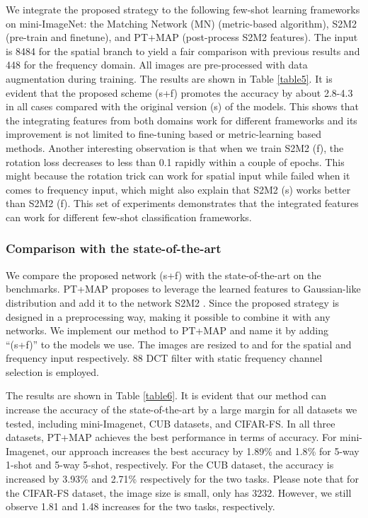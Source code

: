 \documentclass[10pt, conference, compsocconf]{IEEEtran}
\begin{document}
We integrate the proposed strategy to the following few-shot learning frameworks on mini-ImageNet: the Matching Network (MN) \cite{vinyals2016matching} (metric-based algorithm), S2M2 \cite{mangla2020charting} (pre-train and finetune), and PT+MAP \cite{hu2020leveraging} (post-process S2M2 features). The input is 8484 for the spatial branch to yield a fair comparison with previous results and 448 for the frequency domain. All images are pre-processed with data augmentation during training. The results are shown in Table \ref{table5}. It is evident that the proposed scheme (s+f) promotes the accuracy by about 2.8-4.3 in all cases compared with the original version (s) of the models. This shows that the integrating features from both domains work for different frameworks and its improvement is not limited to fine-tuning based or metric-learning based methods. Another interesting observation is that when we train S2M2 (f), the rotation loss decreases to less than 0.1 rapidly within a couple of epochs. This might because the rotation trick can work for spatial input while failed when it comes to frequency input, which might also explain that S2M2 (s) works better than S2M2 (f). This set of experiments demonstrates that the integrated features can work for different few-shot classification frameworks.

\subsubsection{Comparison with the state-of-the-art}

We compare the proposed network (s+f) with the state-of-the-art on the benchmarks. PT+MAP \cite{hu2020leveraging} proposes to leverage the learned features to Gaussian-like distribution and add it to the network S2M2 \cite{mangla2020charting}. Since the proposed strategy is designed in a preprocessing way, making it possible to combine it with any networks. We implement our method to PT+MAP and name it by adding \enquote{(s+f)} to the models we use. The images are resized to  and  for the spatial and frequency input respectively. 88 DCT filter with static frequency channel selection is employed. 

The results are shown in Table \ref{table6}. It is evident that our method can increase the accuracy of the state-of-the-art by a large margin for all datasets we tested, including mini-Imagenet, CUB datasets, and CIFAR-FS. In all three datasets, PT+MAP achieves the best performance in terms of accuracy. For mini-Imagenet, our approach increases the best accuracy by {}{1.89}\% and {}{1.8}\% for 5-way 1-shot and 5-way 5-shot, respectively. For the CUB dataset, the accuracy is increased by {}{3.93}\% and 2.71\% respectively for the two tasks. Please note that for the CIFAR-FS dataset, the image size is small, only has 3232. However, we still observe {}{1.81} and {}{1.48} increases for the two tasks, respectively. 
\end{document}
